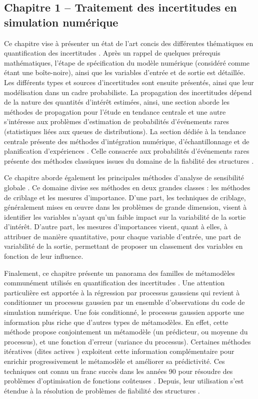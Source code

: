 \subsection*{Chapitre 1 -- Traitement des incertitudes en simulation numérique}
Ce chapitre vise à présenter un état de l'art concis des différentes thématiques en quantification des incertitudes \citep{sullivan_2015}. 
Après un rappel de quelques prérequis mathématiques, l'étape de spécification du modèle numérique (considéré comme étant une boîte-noire), ainsi que les variables d'entrée et de sortie est détaillée. 
Les différents types et sources d'incertitudes sont ensuite présentés, ainsi que leur modélisation dans un cadre probabiliste. 
La propagation des incertitudes dépend de la nature des quantités d'intérêt estimées, ainsi, une section aborde les méthodes de propagation pour l'étude en tendance centrale et une autre s'intéresse aux problèmes d'estimation de probabilités d'événements rares (statistiques liées aux queues de distributions). 
La section dédiée à la tendance centrale présente des méthodes d'intégration numérique, d'échantillonnage et de planification d'expériences \citep{fang_liu_2018}. 
Celle consacrée aux probabilités d'événements rares présente des méthodes classiques issues du domaine de la fiabilité des structures \citep{lemaire_2013,MorioBalesdent2015}.

Ce chapitre aborde également les principales méthodes d'analyse de sensibilité globale \citep{daveiga_iooss_2021}. 
Ce domaine divise ses méthodes en deux grandes classes : les méthodes de criblage et les mesures d'importance. 
D'une part, les techniques de criblage, généralement mises en \oe{}uvre dans les problèmes de grande dimension, visent à identifier les variables n'ayant qu'un faible impact sur la variabilité de la sortie d'intérêt. 
D'autre part, les mesures d'importances visent, quant à elles, à attribuer de manière quantitative, pour chaque variable d'entrée, une part de variabilité de la sortie, permettant de proposer un classement des variables en fonction de leur influence.

Finalement, ce chapitre présente un panorama des familles de métamodèles communément utilisés en quantification des incertitudes \citep{forrester_2008}. 
Une attention particulière est apportée à la régression par processus gaussiens qui revient à conditionner un processus gaussien par un ensemble d'observations du code de simulation numérique. 
Une fois conditionné, le processus gaussien apporte une information plus riche que d'autres types de métamodèles. 
En effet, cette méthode propose conjointement un métamodèle (un prédicteur, ou moyenne du processus), et une fonction d'erreur (variance du processus). 
Certaines méthodes itératives (dites \og actives \fg{}) exploitent cette information complémentaire pour enrichir progressivement le métamodèle et améliorer sa prédictivité. 
Ces techniques ont connu un franc succès dans les années 90 pour résoudre des problèmes d'optimisation de fonctions coûteuses \citep{jones_1998}. 
Depuis, leur utilisation s'est étendue à la résolution de problèmes de fiabilité des structures \citep{echard_2011}.

